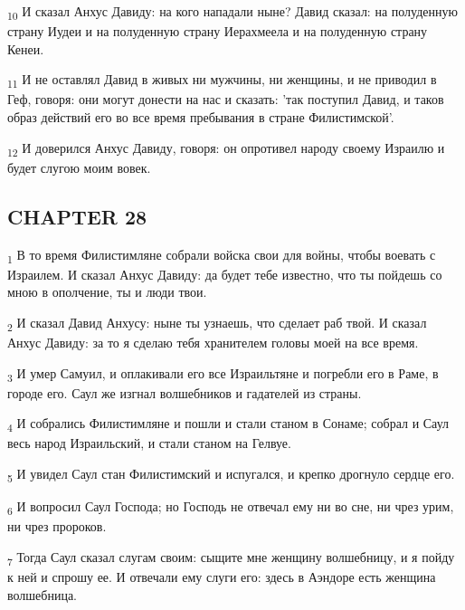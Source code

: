 \begin{tcolorbox}
\textsubscript{10} И сказал Анхус Давиду: на кого нападали ныне? Давид сказал: на полуденную страну Иудеи и на полуденную страну Иерахмеела и на полуденную страну Кенеи.
\end{tcolorbox}
\begin{tcolorbox}
\textsubscript{11} И не оставлял Давид в живых ни мужчины, ни женщины, и не приводил в Геф, говоря: они могут донести на нас и сказать: 'так поступил Давид, и таков образ действий его во все время пребывания в стране Филистимской'.
\end{tcolorbox}
\begin{tcolorbox}
\textsubscript{12} И доверился Анхус Давиду, говоря: он опротивел народу своему Израилю и будет слугою моим вовек.
\end{tcolorbox}
\subsection{CHAPTER 28}
\begin{tcolorbox}
\textsubscript{1} В то время Филистимляне собрали войска свои для войны, чтобы воевать с Израилем. И сказал Анхус Давиду: да будет тебе известно, что ты пойдешь со мною в ополчение, ты и люди твои.
\end{tcolorbox}
\begin{tcolorbox}
\textsubscript{2} И сказал Давид Анхусу: ныне ты узнаешь, что сделает раб твой. И сказал Анхус Давиду: за то я сделаю тебя хранителем головы моей на все время.
\end{tcolorbox}
\begin{tcolorbox}
\textsubscript{3} И умер Самуил, и оплакивали его все Израильтяне и погребли его в Раме, в городе его. Саул же изгнал волшебников и гадателей из страны.
\end{tcolorbox}
\begin{tcolorbox}
\textsubscript{4} И собрались Филистимляне и пошли и стали станом в Сонаме; собрал и Саул весь народ Израильский, и стали станом на Гелвуе.
\end{tcolorbox}
\begin{tcolorbox}
\textsubscript{5} И увидел Саул стан Филистимский и испугался, и крепко дрогнуло сердце его.
\end{tcolorbox}
\begin{tcolorbox}
\textsubscript{6} И вопросил Саул Господа; но Господь не отвечал ему ни во сне, ни чрез урим, ни чрез пророков.
\end{tcolorbox}
\begin{tcolorbox}
\textsubscript{7} Тогда Саул сказал слугам своим: сыщите мне женщину волшебницу, и я пойду к ней и спрошу ее. И отвечали ему слуги его: здесь в Аэндоре есть женщина волшебница.
\end{tcolorbox}
